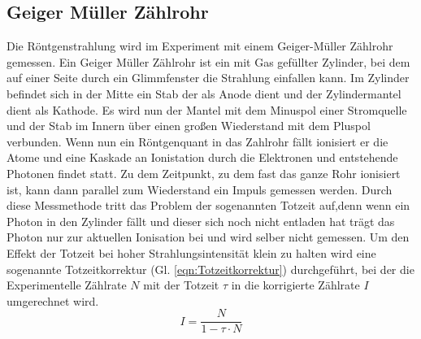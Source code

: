 \subsection{Geiger Müller Zählrohr}
Die Röntgenstrahlung wird im Experiment mit einem Geiger-Müller Zählrohr gemessen.
Ein Geiger Müller Zählrohr ist ein mit Gas gefüllter Zylinder, bei dem auf einer Seite durch ein Glimmfenster die Strahlung einfallen kann.
Im Zylinder befindet sich in der Mitte ein Stab der als Anode dient und der Zylindermantel dient als Kathode.
Es wird nun der Mantel mit dem Minuspol einer Stromquelle und der Stab im Innern über einen großen Wiederstand mit dem Pluspol verbunden.
Wenn nun ein Röntgenquant in das Zahlrohr fällt ionisiert er die Atome und eine Kaskade an Ionistation durch die Elektronen und entstehende Photonen findet statt.
Zu dem Zeitpunkt, zu dem fast das ganze Rohr ionisiert ist, kann dann parallel zum Wiederstand ein Impuls gemessen werden.
Durch diese Messmethode tritt das Problem der sogenannten Totzeit auf,denn wenn ein Photon in den Zylinder fällt und dieser sich noch nicht entladen hat trägt das Photon nur zur aktuellen Ionisation bei und wird selber nicht gemessen.
Um den Effekt der Totzeit bei hoher Strahlungsintensität klein zu halten wird eine sogenannte Totzeitkorrektur (Gl. \ref{eqn:Totzeitkorrektur}) durchgeführt, bei der die Experimentelle Zählrate $N$ mit der Totzeit $\tau$ in die korrigierte Zählrate $I$ umgerechnet wird.
\begin{equation*}
    I  = \frac{N}{1-\tau \cdot N}    \label{eqn:Totzeitkorrektur}
\end{equation*}

